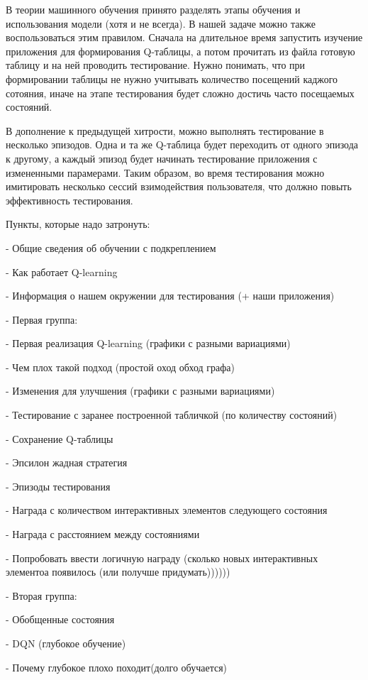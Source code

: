 В теории машинного обучения принято разделять этапы обучения и использования модели (хотя и не всегда). В нашей задаче можно также воспользоваться этим правилом. Сначала на длительное время запустить изучение приложения для формирования Q-таблицы, а потом прочитать из файла готовую таблицу и на ней проводить тестирование. Нужно понимать, что при формировании таблицы не нужно учитывать количество посещений каджого сотояния, иначе на этапе тестирования будет сложно достичь часто посещаемых состояний.

В дополнение к предыдущей хитрости, можно выполнять тестирование в несколько эпизодов. Одна и та же Q-таблица будет переходить от одного эпизода к другому, а каждый эпизод будет начинать тестирование приложения с измененными парамерами. Таким образом, во время тестирования можно имитировать несколько сессий взимодействия пользователя, что должно повыть эффективность тестирования.%






Пункты, которые надо затронуть:

- Общие сведения об обучении с подкреплением

- Как работает Q-learning

- Информация о нашем окружении для тестирования (+ наши приложения)

- Первая группа:

    - Первая реализация Q-learning (графики с разными вариациями)
    
    - Чем плох такой подход (простой оход обход графа)
    
    - Изменения для улучшения (графики с разными вариациями)

        - Тестирование с заранее построенной табличкой (по количеству состояний)
        
        - Сохранение Q-таблицы
        
        - Эпсилон жадная стратегия
        
        - Эпизоды тестирования
        
        - Награда с количеством интерактивных элементов следующего состояния
        
        - Награда с расстоянием между состояниями
        
        - Попробовать ввести логичную награду (сколько новых интерактивных элементоа появилось (или получше придумать))))))

- Вторая группа:

    - Обобщенные состояния
    
    - DQN (глубокое обучение)

    - Почему глубокое плохо походит(долго обучается)